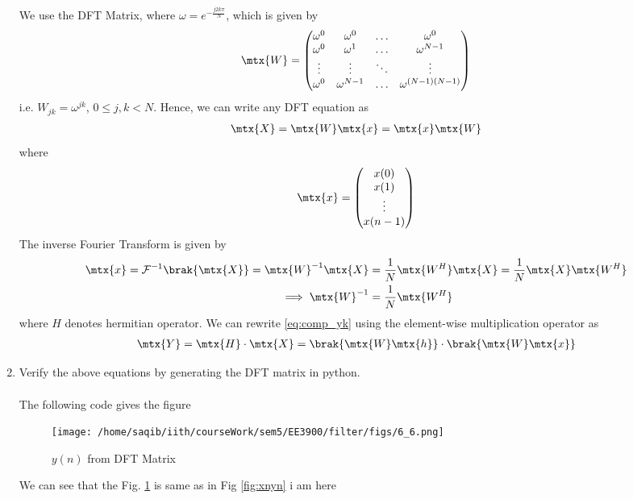 \documentclass[journal,12pt,twocolumn]{IEEEtran}
\renewcommand\thesection{\arabic{section}}
\begin{document}
\begin{enumerate}[label=\thesection.\arabic*]
We use the DFT Matrix, where $\omega = e^{-\frac{j2k\pi}{N}}$, which is given by
\begin{align}
	\mtx{W} = 
	\begin{pmatrix}
		\omega^0 & \omega^0 & \ldots & \omega^0 \\
		\omega^0 & \omega^1 & \ldots & \omega^{N - 1} \\
		\vdots & \vdots & \ddots & \vdots \\
		\omega^0 & \omega^{N - 1} & \ldots & \omega^{(N -1)(N - 1)}
	\end{pmatrix}
\end{align}
i.e. $W_{jk} = \omega^{jk}$, $0 \leq j, k < N$. Hence, we can write any DFT equation as
\begin{align}
	\mtx{X} = \mtx{W}\mtx{x} = \mtx{x}\mtx{W}
\end{align}
\noindent where
\begin{align}
	\mtx{x} = 
	\begin{pmatrix}
		x(0) \\ x(1) \\ \vdots \\ x(n - 1)
	\end{pmatrix}
\end{align}
The inverse Fourier Transform is given by
\begin{align}
	\mtx{x} = \mathcal{F}^{-1}\brak{\mtx{X}} = \mtx{W}^{-1}\mtx{X} &= 
	\frac{1}{N}\mtx{W^{H}}\mtx{X} = \frac{1}{N}\mtx{X}\mtx{W^{H}} \\ 
	\implies \mtx{W}^{-1} &= \frac{1}{N}\mtx{W^{H}}
\end{align}
 where $H$ denotes hermitian operator. We can rewrite \eqref{eq:comp_yk} using the
element-wise multiplication operator as
\begin{align}
	\mtx{Y} = \mtx{H}\cdot\mtx{X} = \brak{\mtx{W}\mtx{h}}\cdot\brak{\mtx{W}\mtx{x}}
\end{align}
\item Verify the above equations by generating the DFT matrix in python.
\\\solution\\
The following code gives the figure

\begin{figure}[!ht]
	\centering
	\texttt{[image: /home/saqib/iith/courseWork/sem5/EE3900/filter/figs/6\_6.png]}
	\caption{$y(n)$ from DFT Matrix}
	\label{fig:yndftmat}
	\end{figure}
We can see that the Fig. \ref{fig:yndftmat} is same as in Fig \ref{fig:xnyn}
i am here
\end{enumerate}
%
\end{document}
